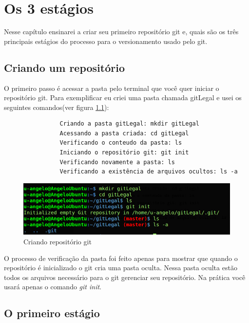 \documentclass[12pt,openright,oneside,a4paper,english,brazil]{abntex2}
\begin{document}
\chapter{Os 3 estágios}

Nesse capítulo ensinarei a criar seu primeiro repositório git e, quais são os três principais estágios do processo para o versionamento usado pelo git.

\section{Criando um repositório}

O primeiro passo é acessar a pasta pelo terminal que você quer iniciar o repositório git. Para exemplificar eu criei uma pasta chamada gitLegal e usei os seguintes comandos(ver figura \ref{repositorio}):

\begin{verbatim}
		        Criando a pasta gitLegal: mkdir gitLegal
		        Acessando a pasta criada: cd gitLegal
		        Verificando o conteudo da pasta: ls
		        Iniciando o repositório git: git init
		        Verificando novamente a pasta: ls
		        Verificando a existência de arquivos ocultos: ls -a
\end{verbatim}

\begin{figure}[h]
	\caption{\label{repositorio}Criando repositório git}
	\begin{center}
		\includegraphics[width=1\linewidth]{imagens/repositorio}
	\end{center}
\end{figure}

O processo de verificação da pasta foi feito apenas para mostrar que quando o repositório é inicializado o git cria uma pasta oculta. Nessa pasta oculta estão todos os arquivos necessário para o git gerenciar seu repositório. Na prática você usará apenas o comando \textit{git init}.

\section{O primeiro estágio}
\end{document}
